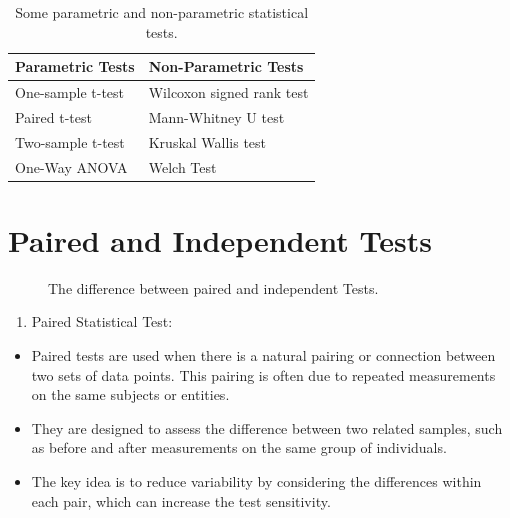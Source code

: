 \documentclass[
  a4paper,
]{scrbook}
\providecommand{\tightlist}{%
  \setlength{\itemsep}{0pt}\setlength{\parskip}{0pt}}\usepackage{longtable,booktabs,array}
\begin{document}
\begin{longtable}{@{\extracolsep{\fill}}ll}

\caption{\label{tbl-ParamTestsvsNonParamTests}Some parametric and
non-parametric statistical tests.}

\tabularnewline

\toprule
\textbf{Parametric Tests} & \textbf{Non-Parametric Tests} \\ 
\midrule\addlinespace[2.5pt]
One-sample t-test & Wilcoxon signed rank test \\ 
Paired t-test & Mann-Whitney U test \\ 
Two-sample t-test & Kruskal Wallis test \\ 
One-Way ANOVA & Welch Test \\ 
\bottomrule

\end{longtable}

\endgroup

\section{Paired and Independent
Tests}\label{paired-and-independent-tests}

\begin{figure}[H]


\caption{\label{fig-pairedvsindep}The difference between paired and
independent Tests.}

\end{figure}%

\begin{enumerate}
\def\labelenumi{\arabic{enumi}.}
\tightlist
\item
  Paired Statistical Test:
\end{enumerate}

\begin{itemize}
\tightlist
\item
  Paired tests are used when there is a natural pairing or connection
  between two sets of data points. This pairing is often due to repeated
  measurements on the same subjects or entities.
\item
  They are designed to assess the difference between two related
  samples, such as before and after measurements on the same group of
  individuals.
\item
  The key idea is to reduce variability by considering the differences
  within each pair, which can increase the test sensitivity.
\end{itemize}
\end{document}
